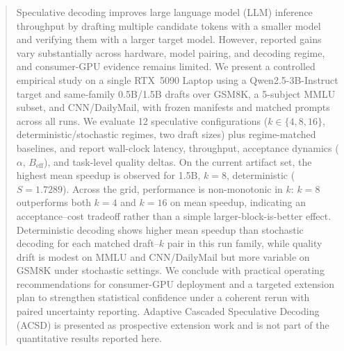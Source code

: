 \begin{abstract}
Speculative decoding improves large language model (LLM) inference throughput by drafting multiple candidate tokens with a smaller model and verifying them with a larger target model. However, reported gains vary substantially across hardware, model pairing, and decoding regime, and consumer-GPU evidence remains limited. We present a controlled empirical study on a single RTX~5090 Laptop using a Qwen2.5-3B-Instruct target and same-family 0.5B/1.5B drafts over GSM8K, a 5-subject MMLU subset, and CNN/DailyMail, with frozen manifests and matched prompts across all runs. We evaluate 12 speculative configurations ($k\in\{4,8,16\}$, deterministic/stochastic regimes, two draft sizes) plus regime-matched baselines, and report wall-clock latency, throughput, acceptance dynamics ($\alpha$, $B_{\text{eff}}$), and task-level quality deltas. On the current artifact set, the highest mean speedup is observed for 1.5B, $k{=}8$, deterministic ($S{=}1.7289$). Across the grid, performance is non-monotonic in $k$: $k{=}8$ outperforms both $k{=}4$ and $k{=}16$ on mean speedup, indicating an acceptance--cost tradeoff rather than a simple larger-block-is-better effect. Deterministic decoding shows higher mean speedup than stochastic decoding for each matched draft--$k$ pair in this run family, while quality drift is modest on MMLU and CNN/DailyMail but more variable on GSM8K under stochastic settings. We conclude with practical operating recommendations for consumer-GPU deployment and a targeted extension plan to strengthen statistical confidence under a coherent rerun with paired uncertainty reporting. Adaptive Cascaded Speculative Decoding (ACSD) is presented as prospective extension work and is not part of the quantitative results reported here.
\end{abstract}